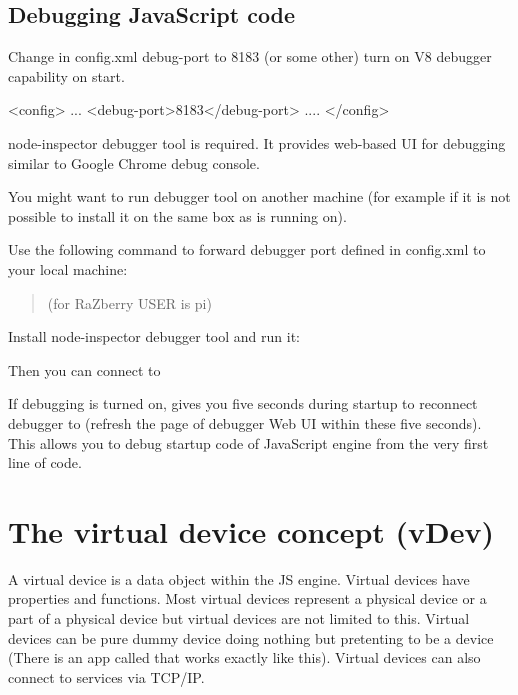 \subsection{Debugging JavaScript code}
Change in config.xml debug-port to 8183 (or some other) turn on V8 debugger capability on \zway start.

\begin{listingverbatim}
<config>
    ...
    <debug-port>8183</debug-port>
    ....
</config>
\end{listingverbatim}

node-inspector debugger tool is required. It provides web-based UI for debugging similar 
to Google Chrome debug console.

You might want to run debugger tool on another machine (for example if it is not possible to 
install it on the same box as \zway is running on).

Use the following command to forward debugger port defined in config.xml to your local machine:
\begin{quote} 
(for RaZberry USER is pi)
\end{quote} 


Install node-inspector debugger tool and run it:
\begin{quote} 
\end{quote} 

Then you can connect to 


If debugging is turned on, \zway gives you five seconds during startup to reconnect debugger to 
\zway (refresh the page of debugger Web UI within these five seconds).
This allows you to debug startup code of \zway JavaScript engine from the very first line of code.

\section{The virtual device concept (vDev)}
\label{cap:vdev}

A virtual device is a data object within the JS engine. Virtual devices have 
properties and functions. Most virtual devices represent a physical device or a part of 
a physical device but virtual devices are not limited to this. Virtual devices can be 
pure dummy device doing nothing but pretenting to be a device (There is an app called
 that works exactly like this). Virtual devices can also connect to
services via TCP/IP.

